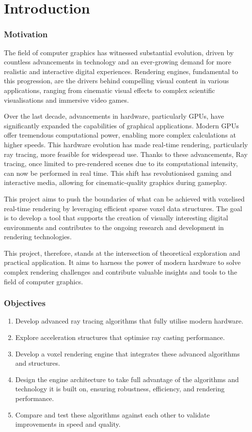 
\part{Introduction}\label{intro}
\section{Motivation}
The field of computer graphics has witnessed substantial evolution, driven by countless advancements in technology and an ever-growing demand for more realistic and interactive digital experiences. Rendering engines, fundamental to this progression, are the drivers behind compelling visual content in various applications, ranging from cinematic visual effects to complex scientific visualisations and immersive video games.

Over the last decade, advancements in hardware, particularly GPUs, have significantly expanded the capabilities of graphical applications. Modern GPUs offer tremendous computational power, enabling more complex calculations at higher speeds. This hardware evolution has made real-time rendering, particularly ray tracing, more feasible for widespread use. Thanks to these advancements, Ray tracing, once limited to pre-rendered scenes due to its computational intensity, can now be performed in real time. This shift has revolutionised gaming and interactive media, allowing for cinematic-quality graphics during gameplay.

This project aims to push the boundaries of what can be achieved with voxelised real-time rendering by leveraging efficient sparse voxel data structures. The goal is to develop a tool that supports the creation of visually interesting digital environments and contributes to the ongoing research and development in rendering technologies.

This project, therefore, stands at the intersection of theoretical exploration and practical application. It aims to harness the power of modern hardware to solve complex rendering challenges and contribute valuable insights and tools to the field of computer graphics.

\section{Objectives}
\label{obj}
\begin{enumerate}
  \item Develop advanced ray tracing algorithms that fully utilise modern hardware.
  \item Explore acceleration structures that optimise ray casting performance.
  \item Develop a voxel rendering engine that integrates these advanced algorithms and structures.
  \item Design the engine architecture to take full advantage of the algorithms and technology it is built on, ensuring robustness, efficiency, and rendering performance.
  \item Compare and test these algorithms against each other to validate improvements in speed and quality.
\end{enumerate}

